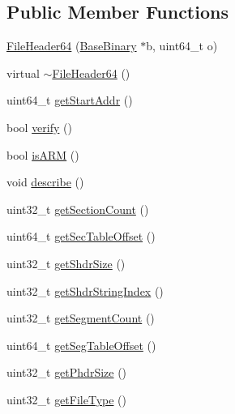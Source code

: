 \subsection*{\-Public \-Member \-Functions}
\begin{DoxyCompactItemize}
\item 
\hyperlink{class_e_p_a_x_1_1_elf_1_1_file_header64_a00cf5857d7fb0d99a29da523667b3561}{\-File\-Header64} (\hyperlink{class_e_p_a_x_1_1_base_binary}{\-Base\-Binary} $\ast$b, uint64\-\_\-t o)
\item 
virtual \hyperlink{class_e_p_a_x_1_1_elf_1_1_file_header64_a66a65eb185ba951c8529fdbd42919a66}{$\sim$\-File\-Header64} ()
\item 
uint64\-\_\-t \hyperlink{class_e_p_a_x_1_1_elf_1_1_file_header64_a0d5fb6bb80415565bec58de93526a2ea}{get\-Start\-Addr} ()
\item 
bool \hyperlink{class_e_p_a_x_1_1_elf_1_1_file_header64_a6a94d18eaee683c6bbe05f3b57f08efc}{verify} ()
\item 
bool \hyperlink{class_e_p_a_x_1_1_elf_1_1_file_header64_a6d992697b0003b0c63f9e9b6271de94a}{is\-A\-R\-M} ()
\item 
void \hyperlink{class_e_p_a_x_1_1_elf_1_1_file_header64_a121602d4ffb4f401b59cdb63303fc6c4}{describe} ()
\item 
uint32\-\_\-t \hyperlink{class_e_p_a_x_1_1_elf_1_1_file_header64_a525b2d31bb8ad212c197172006cd8b90}{get\-Section\-Count} ()
\item 
uint64\-\_\-t \hyperlink{class_e_p_a_x_1_1_elf_1_1_file_header64_ab4bf35526aa8997cdacbe51f401e15a2}{get\-Sec\-Table\-Offset} ()
\item 
uint32\-\_\-t \hyperlink{class_e_p_a_x_1_1_elf_1_1_file_header64_ad4c76f6ef875eccd6e453c61736d7e40}{get\-Shdr\-Size} ()
\item 
uint32\-\_\-t \hyperlink{class_e_p_a_x_1_1_elf_1_1_file_header64_a1e776b6ef8858287951a39a15626a6da}{get\-Shdr\-String\-Index} ()
\item 
uint32\-\_\-t \hyperlink{class_e_p_a_x_1_1_elf_1_1_file_header64_af0e3dc9b8ae0832bd9a24d2c72e09011}{get\-Segment\-Count} ()
\item 
uint64\-\_\-t \hyperlink{class_e_p_a_x_1_1_elf_1_1_file_header64_ad05c5e3abb06032413b058f5db1f3f9c}{get\-Seg\-Table\-Offset} ()
\item 
uint32\-\_\-t \hyperlink{class_e_p_a_x_1_1_elf_1_1_file_header64_a389cfa8997b78c7da91bfd980ad61a94}{get\-Phdr\-Size} ()
\item 
uint32\-\_\-t \hyperlink{class_e_p_a_x_1_1_elf_1_1_file_header64_a84696d5ac94bd884141c4306025b8ba4}{get\-File\-Type} ()
\end{DoxyCompactItemize}


